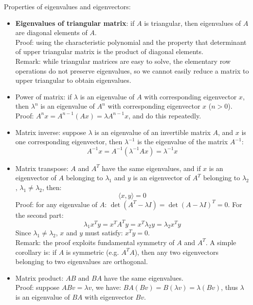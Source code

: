 \documentclass{report}
\begin{document}
Properties of eigenvalues and eigenvectors: 
\begin{itemize}
	\item \textbf{Eigenvalues of triangular matrix}: if $A$ is triangular, then eigenvalues of $A$ are diagonal elements of $A$. \\
	Proof: using the characteristic polynomial and the property that determinant of upper triangular matrix is the product of diagonal elements. \\
	Remark: while triangular matrices are easy to solve, the elementary row operations do not preserve eigenvalues, so we cannot easily reduce a matrix to upper triangular to obtain eigenvalues. 
	
	\item Power of matrix: if $\lambda$ is an eigenvalue of $A$ with corresponding eigenvector $x$, then $\lambda^n$ is an eigenvalue of $A^n$ with corresponding eigenvector $x$ ($n > 0$). \\
	Proof: $A^n x = A^{n-1} (Ax) = \lambda A^{n-1} x$, and do this repeatedly. 
	
	\item Matrix inverse: suppose $\lambda$ is an eigenvalue of an invertible matrix $A$, and $x$ is one corresponding eigenvector, then $\lambda^{-1}$ is the eigenvalue of the matrix $A^{-1}$: 
	\begin{equation}
	A^{-1} x = A^{-1} (\lambda^{-1} Ax) = \lambda^{-1} x	
	\end{equation}
	
	\item Matrix transpose: $A$ and $A^T$ have the same eigenvalues, and if $x$ is an eigenvector of $A$ belonging to $\lambda_1$ and $y$ is an eigenvector of $A^T$ belonging to $\lambda_2$, $\lambda_1 \neq \lambda_2$, then: 
	\begin{equation}
	\langle x,y \rangle = 0	
	\end{equation}
	Proof: for any eigenvalue of $A$: $\det (A^T - \lambda I) = \det (A - \lambda I)^T = 0$. For the second part: 
	\begin{equation}
	\lambda_1 x^T y = x^T A^T y = x^T \lambda_2 y = \lambda_2 x^T y	
	\end{equation}
	Since $\lambda_1 \neq \lambda_2$, $x$ and $y$ must satisfy: $x^T y = 0$. \\
	Remark: the proof exploits fundamental symmetry of $A$ and $A^T$. A simple corollary is: if $A$ is symmetric (e.g. $A^T A$), then any two eigenvectors belonging to two eigenvalues are orthogonal. 	 
	
	\item Matrix product: $AB$ and $BA$ have the same eigenvalues. \\
	Proof: suppose $ABv = \lambda v$, we have: $BA (Bv) = B (\lambda v) = \lambda (Bv)$, thus $\lambda$	is an eigenvalue of $BA$ with eigenvector $Bv$. 
\end{itemize}
\end{document}
